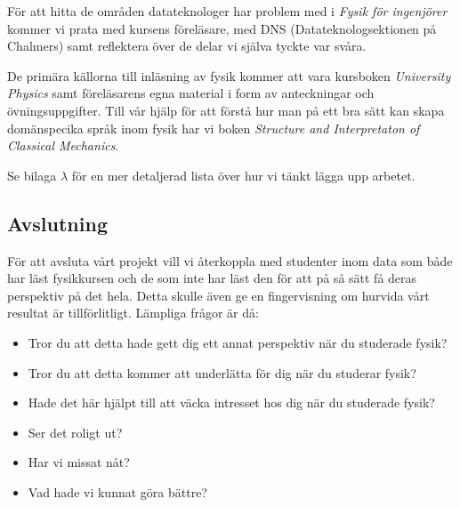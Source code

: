 \documentclass[12pt,a4paper]{article}
\begin{document}
För att hitta de områden datateknologer har problem med i \textit{Fysik för ingenjörer} kommer vi prata med kursens föreläsare, med DNS (Datateknologsektionen på Chalmers) samt reflektera över de delar vi själva tyckte var svåra.

De primära källorna till inläsning av fysik kommer att vara kursboken \textit{University Physics}\cite{UP} samt föreläsarens egna material i form av anteckningar och övningsuppgifter. Till vår hjälp för att förstå hur man på ett bra sätt kan skapa domänspecika språk inom fysik har vi boken \textit{Structure and Interpretaton of Classical Mechanics}\cite{SICM}.

Se bilaga $\lambda$ för en mer detaljerad lista över hur vi tänkt lägga upp arbetet.


\subsection{Avslutning}

För att avsluta vårt projekt vill vi återkoppla med studenter inom data som både har läst fysikkursen och de som inte har läst den för att på så sätt få deras perspektiv på det hela. Detta skulle även ge en fingervisning om hurvida vårt resultat är tillförlitligt. Lämpliga frågor är då:

\begin{itemize}
    \item Tror du att detta hade gett dig ett annat perspektiv när du studerade fysik?
    \item Tror du att detta kommer att underlätta för dig när du studerar fysik?
    \item Hade det här hjälpt till att väcka intresset hos dig när du studerade fysik?
    \item Ser det roligt ut?
    \item Har vi missat nåt?
    \item Vad hade vi kunnat göra bättre?
\end{itemize}
\end{document}

